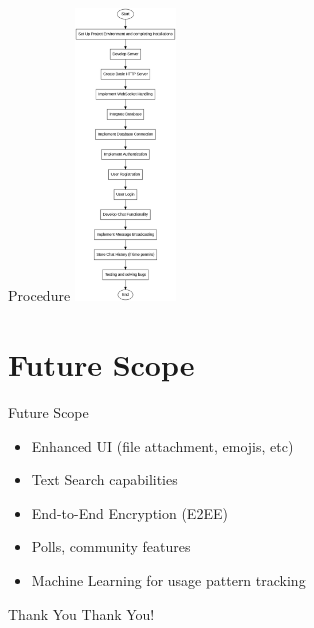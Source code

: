 \documentclass{beamer}
\begin{document}
\begin{frame}{Procedure}
    \centering
    \includegraphics[width=0.2\textwidth]{implementation.png}
\end{frame}

\section{Future Scope}
\begin{frame}{Future Scope}
    \begin{itemize}
        \item Enhanced UI (file attachment, emojis, etc)
        \item Text Search capabilities
        \item End-to-End Encryption (E2EE)
        \item Polls, community features
        \item Machine Learning for usage pattern tracking
    \end{itemize}
\end{frame}


\begin{frame}{Thank You}
    \centering
    \Huge Thank You!
\end{frame}
\end{document}

